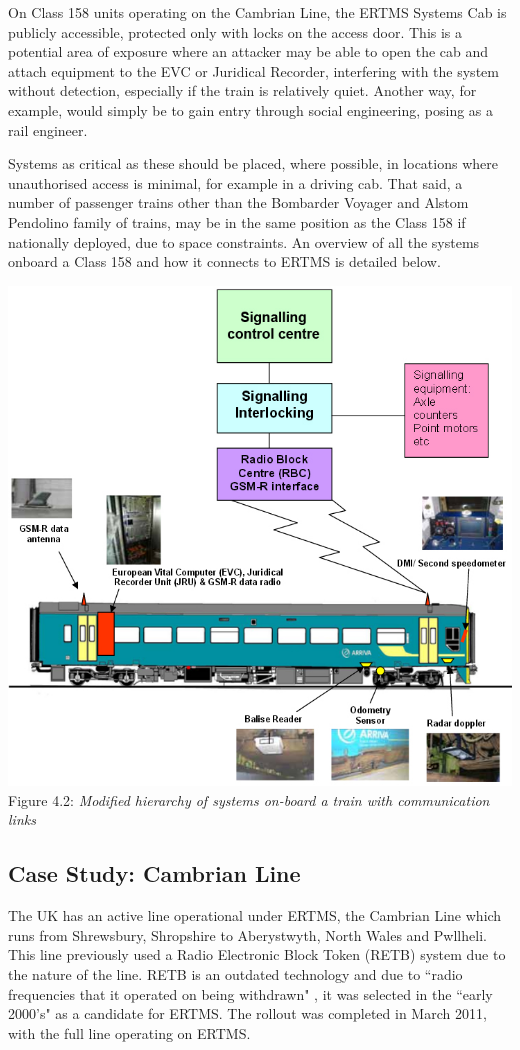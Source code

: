 \documentclass[twoside,11pt,a4paper]{article}
\begin{document}
On Class 158 units operating on the Cambrian Line, the ERTMS Systems Cab is publicly accessible, protected only with locks on the access door. This is a potential area of exposure where an attacker may be able to open the cab and attach equipment to the EVC or Juridical Recorder, interfering with the system without detection, especially if the train is relatively quiet. Another way, for example, would simply be to gain entry through social engineering, posing as a rail engineer.

Systems as critical as these should be placed, where possible, in locations where unauthorised access is minimal, for example in a driving cab. That said, a number of passenger trains other than the Bombarder Voyager and Alstom Pendolino family of trains, may be in the same position as the Class 158 if nationally deployed, due to space constraints. An overview of all the systems onboard a Class 158 and how it connects to ERTMS is detailed below.

\begin{center}
 \includegraphics[scale=.3]{Cl158.jpg}\\
Figure 4.2: \textit{Modified hierarchy of systems on-board a train with communication links \citep[p. 51]{RAIB12a}}
\end{center}

\subsection{Case Study: Cambrian Line}
The UK has an active line operational under ERTMS, the Cambrian Line which runs from Shrewsbury, Shropshire to Aberystwyth, North Wales and Pwllheli. This line previously used a Radio Electronic Block Token (RETB) system due to the nature of the line. RETB is an outdated technology and due to ``radio frequencies that it operated on being withdrawn" \citep[p. 19]{RAIB12a}, it was selected in the ``early 2000's" as a candidate for ERTMS. The rollout was completed in March 2011, with the full line operating on ERTMS.
\end{document}
